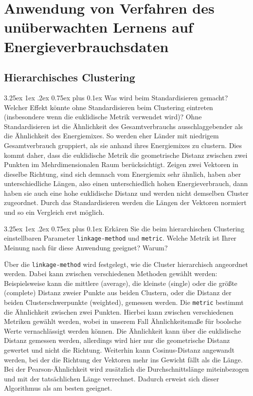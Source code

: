 \documentclass[12pt,a4paper]{scrartcl}
\makeatletter
\renewcommand\subparagraph{\@startsection{subparagraph}{5}{\parindent}%
    {3.25ex \@plus1ex \@minus .2ex}%
    {0.75ex plus 0.1ex}%
    {\normalfont\normalsize\bfseries}}
\makeatother
\begin{document}
\section*{Anwendung von Verfahren des un\"uberwachten Lernens auf Energieverbrauchsdaten}

\subsection*{Hierarchisches Clustering}
\subparagraph{Was wird beim Standardisieren gemacht? Welcher Effekt k\"onnte ohne Standardisieren beim Clustering eintreten (insbesondere wenn die euklidische Metrik verwendet wird)?}
Ohne Standardisieren ist die \"Ahnlichkeit des Gesamtverbrauchs ausschlaggebender als die \"Ahnlichkeit des Energiemixes. So werden eher L\"ander mit niedrigem Gesamtverbrauch gruppiert, als sie anhand ihres Energiemixes zu clustern. Dies kommt daher, dass die euklidische Metrik die geometrische Distanz zwischen zwei Punkten im Mehrdimensionalen Raum ber\"ucksichtigt. Zeigen zwei Vektoren in dieselbe Richtung, sind sich demnach vom Energiemix sehr \"ahnlich, haben aber unterschiedliche L\"angen, also einen unterschiedlich hohen Energieverbrauch, dann haben sie auch eine hohe euklidische Distanz und werden nicht demselben Cluster zugeordnet.
Durch das Standardisieren werden die L\"angen der Vektoren normiert und so ein Vergleich erst m\"oglich.

\subparagraph{Erk\"aren Sie die beim hierarchischen Clustering einstellbaren Parameter \lstinline{linkage-method} und \lstinline{metric}. Welche Metrik ist Ihrer Meinung nach f\"ur diese Anwendung geeignet? Warum?}

\"Uber die \lstinline{linkage-method} wird festgelegt, wie die Cluster hierarchisch angeordnet werden. Dabei kann zwischen verschiedenen Methoden gew\"ahlt werden: Beispielsweise kann die mittlere (average), die kleinste (single) oder die gr\"o\ss te (complete) Distanz zweier Punkte aus beiden Clustern, oder die Distanz der beiden Clusterschwerpunkte (weighted), gemessen werden. 
Die \lstinline{metric}  bestimmt die \"Ahnlichkeit zwischen zwei Punkten. Hierbei kann zwischen verschiedenen Metriken gew\"ahlt werden, wobei in unserem Fall \"Ahnlichkeitsma\ss e f\"ur boolsche Werte vernachl\"assigt werden k\"onnen. 
Die \"Ahnlichkeit kann \"uber die euklidische Distanz gemessen werden, allerdings wird hier nur die geometrische Distanz gewertet und nicht die Richtung. Weiterhin kann Cosinus-Distanz angewandt werden, bei der die Richtung der Vektoren mehr ins Gewicht f\"allt als die L\"ange. 
Bei der Pearson-\"Ahnlichkeit wird zus\"atzlich die Durchschnittsl\"ange miteinbezogen und mit der tats\"achlichen L\"ange verrechnet. Dadurch erweist sich dieser Algorithmus als am besten geeignet. 
\end{document}
